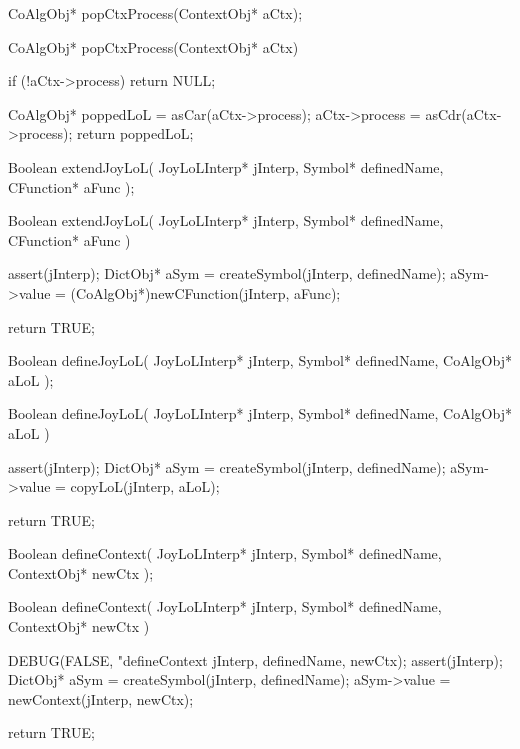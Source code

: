 \startCHeader
CoAlgObj* popCtxProcess(ContextObj* aCtx);
\stopCHeader

\startCCode
CoAlgObj* popCtxProcess(ContextObj* aCtx) {
  if (!aCtx->process) return NULL;

  CoAlgObj* poppedLoL = asCar(aCtx->process);
  aCtx->process       = asCdr(aCtx->process);
  return poppedLoL;
}
\stopCCode

\startCHeader
Boolean extendJoyLoL(
  JoyLoLInterp* jInterp,
  Symbol* definedName,
  CFunction* aFunc
);
\stopCHeader

\startCCode
Boolean extendJoyLoL(
  JoyLoLInterp* jInterp,
  Symbol* definedName,
  CFunction* aFunc
) {
  assert(jInterp);
  DictObj* aSym =
    createSymbol(jInterp, definedName);
  aSym->value =
    (CoAlgObj*)newCFunction(jInterp, aFunc);

  return TRUE;
}
\stopCCode

\startCHeader
Boolean defineJoyLoL(
  JoyLoLInterp* jInterp,
  Symbol* definedName,
  CoAlgObj* aLoL
);
\stopCHeader

\startCCode
Boolean defineJoyLoL(
  JoyLoLInterp* jInterp,
  Symbol* definedName,
  CoAlgObj* aLoL
) {
  assert(jInterp);
  DictObj* aSym =
    createSymbol(jInterp, definedName);
  aSym->value = copyLoL(jInterp, aLoL);

  return TRUE;
}
\stopCCode

\starttyping
\startCHeader
Boolean defineContext(
  JoyLoLInterp* jInterp,
  Symbol* definedName,
  ContextObj* newCtx
);
\stopCHeader

\startCCode
Boolean defineContext(
  JoyLoLInterp* jInterp,
  Symbol* definedName,
  ContextObj* newCtx
) {
  DEBUG(FALSE, "defineContext %
        jInterp, definedName, newCtx);
  assert(jInterp);
  DictObj* aSym =
    createSymbol(jInterp, definedName);
  aSym->value   = newContext(jInterp, newCtx);

  return TRUE;
}
\stopCCode
\stoptyping
